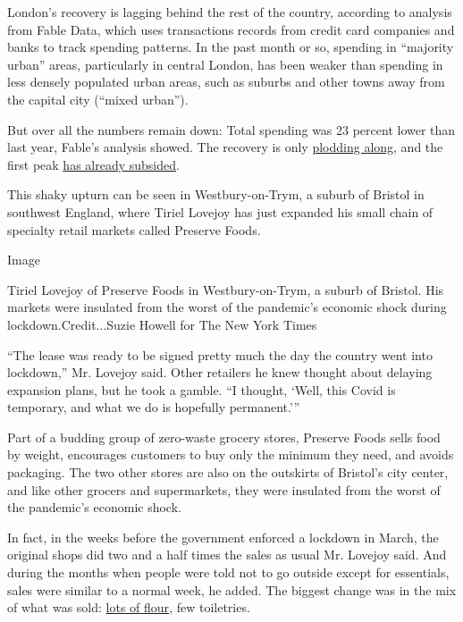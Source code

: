 London's recovery is lagging behind the rest of the country, according
to analysis from Fable Data, which uses transactions records from credit
card companies and banks to track spending patterns. In the past month
or so, spending in ``majority urban'' areas, particularly in central
London, has been weaker than spending in less densely populated urban
areas, such as suburbs and other towns away from the capital city
(``mixed urban'').

But over all the numbers remain down: Total spending was 23 percent
lower than last year, Fable's analysis showed. The recovery is only
\href{https://www.nytimes.com/2020/07/14/business/britains-economic-recovery-disappointed-in-may-as-businesses-started-to-reopen.html}{plodding
along}, and the first peak
\href{https://www.nytimes.com/live/2020/07/24/business/stock-market-updates-coronavirus\#british-retail-sales-see-a-v-shaped-recovery-but-it-may-not-last}{has
already subsided}.

This shaky upturn can be seen in Westbury-on-Trym, a suburb of Bristol
in southwest England, where Tiriel Lovejoy has just expanded his small
chain of specialty retail markets called Preserve Foods.

Image

Tiriel Lovejoy of Preserve Foods in Westbury-on-Trym, a suburb of
Bristol. His markets were insulated from the worst of the pandemic's
economic shock during lockdown.Credit...Suzie Howell for The New York
Times

``The lease was ready to be signed pretty much the day the country went
into lockdown,'' Mr. Lovejoy said. Other retailers he knew thought about
delaying expansion plans, but he took a gamble. ``I thought, `Well, this
Covid is temporary, and what we do is hopefully permanent.'''

Part of a budding group of zero-waste grocery stores, Preserve Foods
sells food by weight, encourages customers to buy only the minimum they
need, and avoids packaging. The two other stores are also on the
outskirts of Bristol's city center, and like other grocers and
supermarkets, they were insulated from the worst of the pandemic's
economic shock.

In fact, in the weeks before the government enforced a lockdown in
March, the original shops did two and a half times the sales as usual
Mr. Lovejoy said. And during the months when people were told not to go
outside except for essentials, sales were similar to a normal week, he
added. The biggest change was in the mix of what was sold:
\href{https://www.nytimes.com/2020/05/20/business/britain-flour-mills-baking.html}{lots
of flour}, few toiletries.

